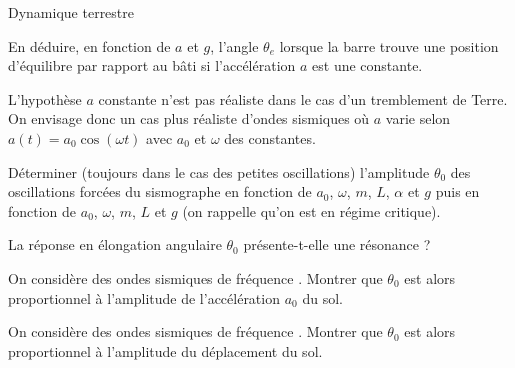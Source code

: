 \begin{exo}[PC][1][devoir]{Dynamique terrestre}
\begin{quest}
\item En déduire, en fonction de $a$ et $g$, l'angle $\theta_e$ lorsque la barre trouve une position d'équilibre par rapport au bâti si l'accélération $a$ est une constante.


\end{quest}

L'hypothèse $a$ constante  n'est pas réaliste dans le cas d'un tremblement de Terre. On envisage donc un cas plus réaliste d'ondes sismiques où $a$ varie selon $a(t) = a_0 \cos(\omega t)$ avec $a_0$ et $\omega$ des constantes.

\begin{quest}
\item Déterminer (toujours dans le cas des petites oscillations) l'amplitude $\theta_0$ des oscillations forcées du sismographe en fonction de $a_0$, $\omega$, $m$, $L$, $\alpha$ et $g$ puis en fonction de $a_0$, $\omega$, $m$, $L$ et $g$ (on rappelle qu'on est en régime critique).




\item La réponse en élongation angulaire $\theta_0$ présente-t-elle une résonance ?


\item On considère des ondes sismiques de fréquence . Montrer que $\theta_0$ est alors proportionnel à l'amplitude de l'accélération $a_0$ du sol.


\item On considère des ondes sismiques de fréquence . Montrer que $\theta_0$ est alors proportionnel à l'amplitude du déplacement du sol.


\end{quest}
\end{exo}
